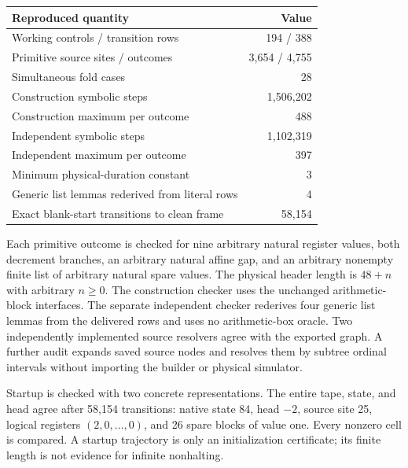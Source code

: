 \documentclass[11pt,letterpaper]{article}
\begin{document}
\begin{center}
\begin{tabular}{lr}
\toprule Reproduced quantity&Value\\\midrule
Working controls / transition rows&194 / 388\\
Primitive source sites / outcomes&3,654 / 4,755\\
Simultaneous fold cases&28\\
Construction symbolic steps&1,506,202\\
Construction maximum per outcome&488\\
Independent symbolic steps&1,102,319\\
Independent maximum per outcome&397\\
Minimum physical-duration constant&3\\
Generic list lemmas rederived from literal rows&4\\
Exact blank-start transitions to clean frame&58,154\\
\bottomrule
\end{tabular}
\end{center}

Each primitive outcome is checked for nine arbitrary natural register
values, both decrement branches, an arbitrary natural affine gap, and an
arbitrary nonempty finite list of arbitrary natural spare values.
The physical header length is $48+n$ with arbitrary $n\ge0$.
The construction checker uses the unchanged arithmetic-block interfaces.
The separate independent checker rederives four generic list lemmas from
the delivered rows and uses no arithmetic-box oracle. Two independently
implemented source resolvers agree with the exported graph. A further
audit expands saved source nodes and resolves them by subtree ordinal
intervals without importing the builder or physical simulator.

Startup is checked with two concrete representations. The entire tape,
state, and head agree after 58,154 transitions: native state 84, head $-2$,
source site 25, logical registers $(2,0,\ldots,0)$, and 26 spare blocks of
value one. Every nonzero cell is compared. A startup trajectory is only an
initialization certificate; its finite length is not evidence for infinite
nonhalting.
\end{document}
